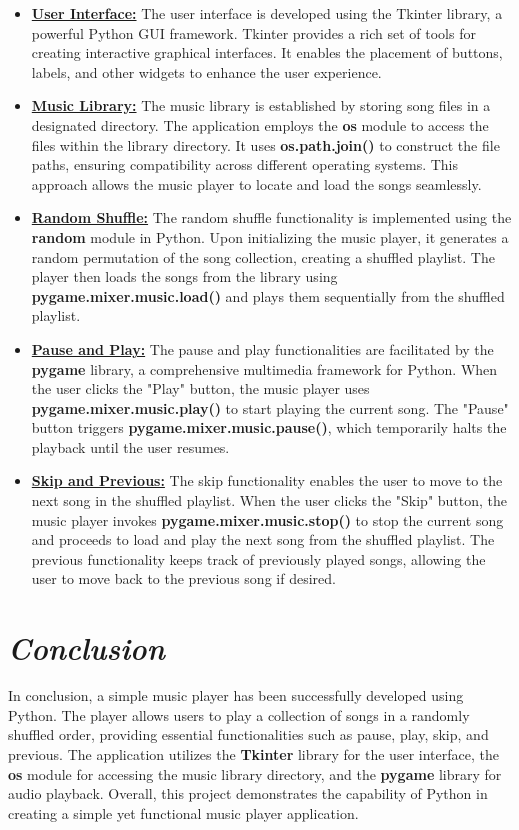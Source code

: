 \documentclass{article}
\begin{document}
\begin{itemize}
    \item \textbf{\underline{User Interface:}} The user interface is developed using the Tkinter library, a powerful Python GUI framework. Tkinter provides a rich set of tools for creating interactive graphical interfaces. It enables the placement of buttons, labels, and other widgets to enhance the user experience.
    \item \textbf{\underline{Music Library:}} The music library is established by storing song files in a designated directory. The application employs the \textbf{os} module to access the files within the library directory. It uses \textbf{os.path.join()} to construct the file paths, ensuring compatibility across different operating systems. This approach allows the music player to locate and load the songs seamlessly.
    \item \textbf{\underline{Random Shuffle:}} The random shuffle functionality is implemented using the \textbf{random} module in Python. Upon initializing the music player, it generates a random permutation of the song collection, creating a shuffled playlist. The player then loads the songs from the library using \textbf{pygame.mixer.music.load()} and plays them sequentially from the shuffled playlist.
    \item \textbf{\underline{Pause and Play:}} The pause and play functionalities are facilitated by the \textbf{pygame} library, a comprehensive multimedia framework for Python. When the user clicks the "Play" button, the music player uses \\ \textbf{pygame.mixer.music.play()} to start playing the current song. The "Pause" button triggers \textbf{pygame.mixer.music.pause()}, which temporarily halts the playback until the user resumes.

    \item \textbf{\underline{Skip and Previous:}} The skip functionality enables the user to move to the next song in the shuffled playlist. When the user clicks the "Skip" button, the music player invokes \textbf{pygame.mixer.music.stop()} to stop the current song and proceeds to load and play the next song from the shuffled playlist. The previous functionality keeps track of previously played songs, allowing the user to move back to the previous song if desired.

    
\end{itemize}

\section{\emph{Conclusion}}
In conclusion, a simple music player has been successfully developed using Python. The player allows users to play a collection of songs in a randomly shuffled order, providing essential functionalities such as pause, play, skip, and previous. The application utilizes the \textbf{Tkinter} library for the user interface, the \textbf{os} module for accessing the music library directory, and the \textbf{pygame} library for audio playback.
Overall, this project demonstrates the capability of Python in creating a simple yet functional music player application. 
\end{document}
